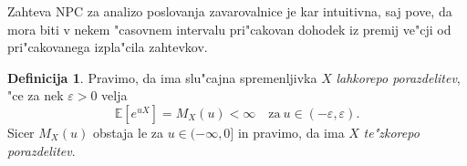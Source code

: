 \documentclass[12pt, a4paper, reqno]{amsart}
\theoremstyle{definition}
\newtheorem{definicija}{Definicija}[section]
\theoremstyle{plain}
\newcommand{\E}{\mathbb{E}}
\newcommand{\1}{\mathds{1}}
\begin{document}
        Zahteva NPC za analizo poslovanja zavarovalnice je kar intuitivna, saj pove, da mora  
        biti v nekem "casovnem intervalu pri"cakovan dohodek iz premij ve"cji od pri"cakovanega izpla"cila zahtevkov.

        \begin{definicija}
            Pravimo, da ima slu"cajna spremenljivka $X$ \textit{lahkorepo porazdelitev}, "ce za 
            nek $\varepsilon > 0$ velja
        \begin{equation*}
            \E\left[e^{uX}\right] = M_X(u) < \infty \quad \text{za} \ u \in (-\varepsilon, \varepsilon).
        \end{equation*}
        Sicer $M_X(u)$ obstaja le za $u\in(-\infty, 0]$ in pravimo, 
        da ima $X$ \textit{te"zkorepo porazdelitev}.
        \label{def:lahkorepnaPorazdelitev}
        \end{definicija}
\end{document}

